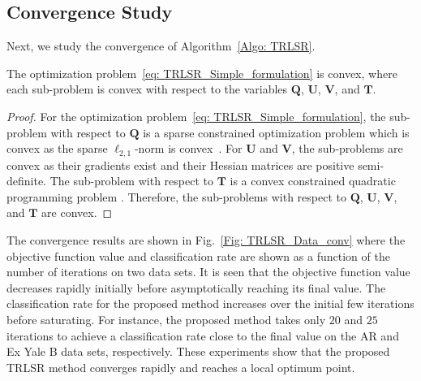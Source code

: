 \subsection{Convergence Study}
\label{subsec: TRLSR_conv_study}
Next, we study the convergence of Algorithm~\ref{Algo: TRLSR}.
\begin{prop}
\label{prop: Prop_conv}
The optimization problem~\eqref{eq: TRLSR_Simple_formulation} is convex, where each sub-problem is convex with respect to the variables $\bm{Q}$, $\bm{U}$, $\bm{V}$, and $\bm{T}$.
\end{prop}
%
\begin{proof}
\label{proof: Convex_conv}
%
For the optimization problem~\eqref{eq: TRLSR_Simple_formulation}, the sub-problem with respect to $\bm{Q}$ is a sparse constrained optimization problem which is convex as the sparse $\ell_{2,1}$-norm is convex~\cite{DLSR}. For $\bm{U}$ and $\bm{V}$, the sub-problems are convex as their gradients exist and their Hessian matrices are positive semi-definite. The sub-problem with respect to $\bm{T}$ is a convex constrained quadratic programming problem \cite{ReLSR}. Therefore, the sub-problems with respect to $\bm{Q}$, $\bm{U}$, $\bm{V}$, and $\bm{T}$ are convex.
%
\end{proof}
%
The convergence results are shown in Fig.~\ref{Fig: TRLSR_Data_conv} where the objective function value and classification rate are shown as a function of the number of iterations on two data sets. It is seen that the objective function value decreases rapidly initially before asymptotically reaching its final value. The classification rate for the proposed method increases over the initial few iterations before saturating. For instance, the proposed method takes only $20$ and $25$ iterations to achieve a classification rate close to the final value on the AR and Ex Yale B data sets, respectively. These experiments show that the proposed TRLSR method converges rapidly and reaches a local optimum point.
%
